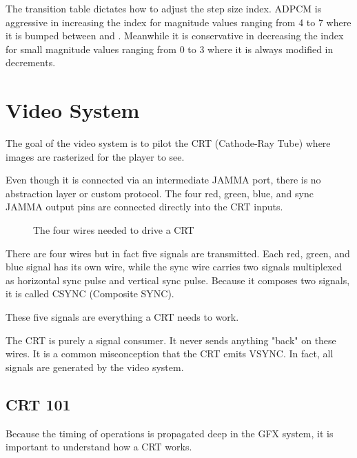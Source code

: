 



The transition table dictates how to adjust the step size index. ADPCM is aggressive in increasing the index for magnitude values ranging from 4 to 7 where it is bumped between  and . Meanwhile it is conservative in decreasing the index for small magnitude values ranging from 0 to 3 where it is always modified in  decrements.








\pagebreak
\section{Video System}
The goal of the video system is to pilot the CRT (Cathode-Ray Tube) where images are rasterized for the player to see.

Even though it is connected via an intermediate JAMMA port, there is no abstraction layer or custom protocol. The four red, green, blue, and sync JAMMA output pins are connected directly into the CRT inputs.

\begin{figure}[H]
\caption*{The four wires needed to drive a CRT}
\end{figure}


There are four wires but in fact five signals are transmitted. Each red, green, and blue signal has its own wire, while the sync wire carries two signals multiplexed as horizontal sync pulse and vertical sync pulse. Because it composes two signals, it is called CSYNC (Composite SYNC). 

These five signals are everything a CRT needs to work. 

\begin{trivia} The CRT is purely a signal consumer. It never sends anything "back" on these wires. It is a common misconception that the CRT emits VSYNC. In fact, all signals are generated by the video system.
\end{trivia}


\subsection{CRT 101}

Because the timing of operations is propagated deep in the GFX system, it is important to understand how a CRT works.

